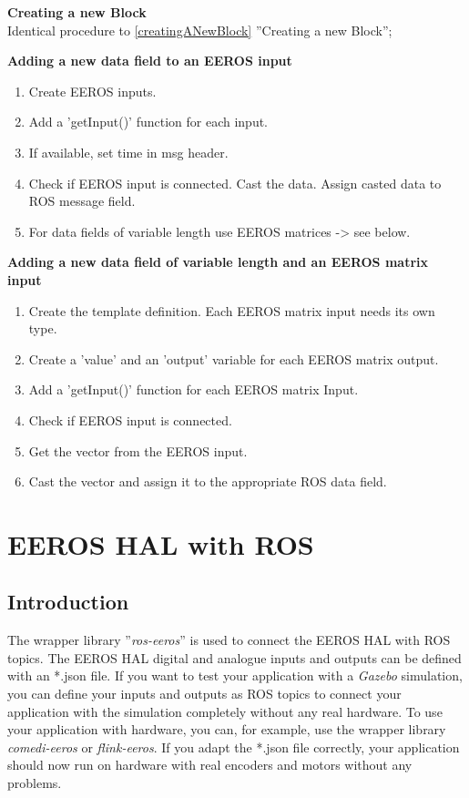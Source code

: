 \textbf{Creating a new Block}\\
Identical procedure to \ref{creatingANewBlock} ''Creating a new Block'';

\textbf{Adding a new data field to an EEROS input}
\begin{enumerate}[\hspace{0.5cm}{B}-1]
\item Create EEROS inputs.
\item Add a 'getInput()' function for each input.
\item If available, set time in msg header.
\item Check if EEROS input is connected. Cast the data. Assign casted data to ROS message field.
\item For data fields of variable length use EEROS matrices -> see below.
\end{enumerate}

\textbf{Adding a new data field of variable length and an EEROS matrix input}
\begin{enumerate}[\hspace{0.5cm}{C}-1]
\item Create the template definition. Each EEROS matrix input needs its own type.
\item Create a 'value' and an 'output' variable for each EEROS matrix output.
\item Add a 'getInput()' function for each EEROS matrix Input.
\item Check if EEROS input is connected.
\item Get the vector from the EEROS input.
\item Cast the vector and assign it to the appropriate ROS data field.
\end{enumerate}



\section{EEROS HAL with ROS}
\label{rosHal}
\subsection{Introduction}
The wrapper library ''\textit{ros-eeros}'' is used to connect the EEROS HAL with ROS topics.
The EEROS HAL digital and analogue inputs and outputs can be defined with an *.json file.
If you want to test your application with a \textit{Gazebo} simulation, you can define your inputs and outputs as ROS topics to connect your application with the simulation completely without any real hardware.
To use your application with hardware, you can, for example, use the wrapper library \textit{comedi-eeros} or \textit{flink-eeros}.
If you adapt the *.json file correctly, your application should now run on hardware with real encoders and motors without any problems.

